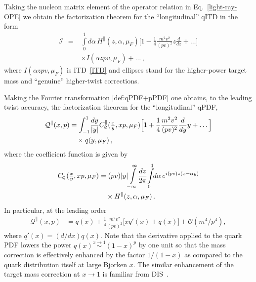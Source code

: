 Taking the nucleon matrix element of the operator relation in Eq.~\eqref{light-ray-OPE} we obtain the 
factorization theorem for the ``longitudinal'' qITD in the form
\begin{align}
\mathcal{I}^\parallel   = &
 \int\limits_0^1 d\alpha \, H^\parallel(z,\alpha,\mu_F)
  \Big[1 - \frac{1}{4} \frac{m^2 v^2}{(pv)^2} z\frac{d}{dz} +\ldots \Big]\\ & \nonumber
\times I(\alpha z pv , \mu_F)
+\ldots\,,
\end{align}
where $I(\alpha z pv,\mu_F)$ is  ITD~\eqref{ITD} and ellipses stand for the higher-power target mass 
and ``genuine'' higher-twist corrections.

Making the Fourier transformation \eqref{def:qPDF+pPDF} one obtains, to the leading twist accuracy,
the factorization theorem for the ``longitudinal'' qPDF,
\begin{align}
\label{qPDF2}
 \mathcal{Q}^\parallel(x,p) &= \int_{-1}^1 \!\frac{dy}{|y|} C^\parallel_{\!\scriptscriptstyle \mathcal{Q}}(\tfrac{x}{y},xp,\mu_F)
\Big[1 + \frac{1}{4} \frac{m^2 v^2}{(pv)^2} \frac{d}{dy} y +\ldots \Big] 
\notag\\&\quad 
\times  q(y,\mu_F)\,, 
\end{align}
where the coefficient function is given by 
\begin{align}
  C^\parallel_{\!\scriptscriptstyle \mathcal{Q}}(\tfrac{x}{y},xp,\mu_F) &= (pv)|y|\!\int\limits_{-\infty}^{\infty}\!\frac{dz}{2\pi}\! \int\limits_0^1\!\! d\alpha\,
e^{i(pv)z(x-\alpha y)}
\notag\\&\quad \times H^\parallel(z,\alpha,\mu_F)\,. 
\end{align} 
In particular, at the leading order
\begin{align}
\label{target-parallel}
 \mathcal{Q}^\parallel(x,p) &= q(x) + \frac{1}{4} \frac{m^2 v^2}{(pv)^2} \big[x q'(x)  + q(x)\big]
+ \mathcal{O}\left({m^4}/{p^4}\right),
\end{align}
where $q'(x) = (d/dx) q(x)$. Note that the derivative applied to the quark PDF lowers the power $q(x) \stackrel{x \to 1}{\sim} (1-x)^p$ by one unit so that the mass correction is effectively enhanced by the factor $1/(1-x)$ as compared to the quark distribution itself at large Bjorken $x$. The similar enhancement of the target mass correction at $x\to 1$ is familiar from DIS~\cite{Nachtmann:1973mr}.

